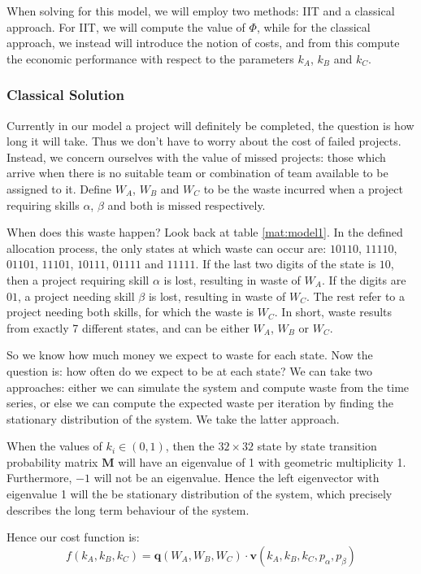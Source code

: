 When solving for this model, we will employ two methods: IIT and a classical approach. For IIT, we will compute the value of $\Phi$, while for the classical approach, we instead will introduce the notion of costs, and from this compute the economic performance with respect to the parameters $k_A$, $k_B$ and $k_C$. 

\subsubsection{Classical Solution}
Currently in our model a project will definitely be completed, the question is how long it will take. Thus we don't have to worry about the cost of failed projects. Instead, we concern ourselves with the value of missed projects: those which arrive when there is no suitable team or combination of team available to be assigned to it. Define $W_A$, $W_B$ and $W_C$ to be the waste incurred when a project requiring skills $\alpha$, $\beta$ and both  is missed respectively.

When does this waste happen? Look back at table \ref{mat:model1}. In the defined allocation process, the only states at which waste can occur are: $10110$, $11110$, $01101$, $11101$, $10111$, $01111$ and $11111$. If the last two digits of the state is $10$, then a project requiring skill $\alpha$ is lost, resulting in waste of $W_A$. If the digits are $01$, a project needing skill $\beta$ is lost, resulting in waste of $W_C$. The rest refer to a project needing both skills, for which the waste is $W_C$. In short, waste results from exactly 7 different states, and can be either $W_A$, $W_B$ or $W_C$.

So we know how much money we expect to waste for each state. Now the question is: how often do we expect to be at each state? We can take two approaches: either we can simulate the system and compute waste from the time series, or else we can compute the expected waste per iteration by finding the stationary distribution of the system. We take the latter approach.

When the values of $k_i \in (0,1)$, then the $32\times32$ state by state transition probability matrix $\mathbf{M}$ will have an eigenvalue of 1 with geometric multiplicity 1. Furthermore, $-1$ will not be an eigenvalue. Hence the left eigenvector with eigenvalue 1 will the be stationary distribution of the system, which precisely describes the long term behaviour of the system. 

Hence our cost function is:
\begin{equation}
\label{eq:simple_model_cost_function}
f(k_A, k_B, k_C) = \mathbf{q}(W_A, W_B, W_C) \cdot \mathbf{v}(k_A, k_B, k_C, p_\alpha, p_\beta)
\end{equation}

